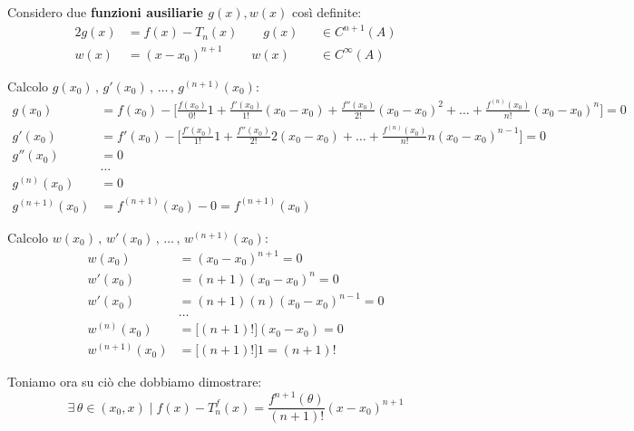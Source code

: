 \documentclass[../../dimostrazioni]{subfiles}
\begin{document}
            \medskip

            Considero due \textbf{funzioni ausiliarie \(g(x), w(x)\)} così definite:
            \begin{alignat*}{2}
                g(x) &= f(x) - T_n (x) \qquad g(x) &&\in C^{n+1} (A)\\
                w(x) &= (x - x_0)^{n+1} \qquad \; w(x) &&\in C^{\infty} (A)
            \end{alignat*}

            \newpage

            Calcolo \( g(x_0)\, , \, g'(x_0)\, ,\, \dots\, , \, g ^{(n+1)}(x_0)  \):
            \begin{align*}
                g(x_0) &= f(x_0) - \bigg[\frac{f(x_0)}{0!}1 + \frac{f'(x_0)}{1!}(x_0-x_0) + \frac{f''(x_0)}{2!}(x_0-x_0)^2 + \dots + \frac{f^{(n)}(x_0)}{n!}(x_0-x_0)^n \bigg] = 0\\
                g'(x_0) &= f'(x_0) - \bigg[\frac{f'(x_0)}{1!}1 + \frac{f''(x_0)}{2!}2(x_0-x_0) + \dots + \frac{f^{(n)}(x_0)}{n!}n(x_0-x_0)^{n-1} \bigg] = 0\\
                g''(x_0) &= 0\\
                &\dots\\
                g^{(n)} (x_0) &= 0\\
                g^{(n+1)} (x_0) &= f^{(n+1)}(x_0) - 0 = f^{(n+1)}(x_0)
            \end{align*}

            \bigskip
            
            Calcolo \( w(x_0)\, , \, w'(x_0)\, ,\, \dots\, , \, w ^{(n+1)}(x_0)  \):
            \begin{align*}
                w(x_0) &= (x_0 - x_0)^{n+1} = 0\\
                w'(x_0) &= (n+1)(x_0 - x_0)^{n} = 0\\
                w'(x_0) &= (n+1)(n)(x_0 - x_0)^{n-1} = 0\\
                & \dots\\
                w^{(n)} (x_0) &= \big[(n+1)!\big](x_0 - x_0) = 0\\
                w^{(n+1)} (x_0) &= \big[(n+1)!\big] 1 = (n+1)!
            \end{align*}

            \bigskip

            Toniamo ora su ciò che dobbiamo dimostrare:
            \[  \exists \, \theta \in (x_0, x) \; | \; f(x) - T _n ^ f (x) = \frac{f^{n+1}(\theta)}{(n+1)!}(x-x_0)^{n+1} \]
\end{document}
